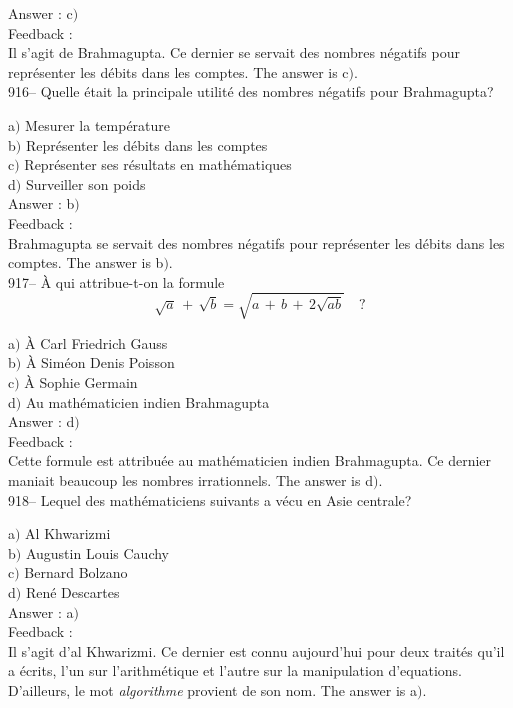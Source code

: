 ﻿\documentclass[letterpaper, 12pt]{article}
\begin{document}
Answer : c$)$\\

Feedback : \\
Il s'agit de Brahmagupta. Ce dernier se servait des nombres n\'egatifs pour
repr\'esenter les d\'ebits dans les comptes. The answer is c$)$.\\

916-- Quelle \'etait la principale utilit\'e des nombres n\'egatifs
pour Brahmagupta?

a$)$ Mesurer la temp\'erature \\
b$)$ Repr\'esenter les d\'ebits dans les comptes \\
c$)$ Repr\'esenter ses r\'esultats en math\'ematiques \\
d$)$ Surveiller son poids  \\

Answer : b$)$\\

Feedback : \\
Brahmagupta se servait des nombres n\'egatifs pour repr\'esenter les
d\'ebits dans les comptes. The answer is b$)$.\\

917-- \`A qui attribue-t-on la formule
$$\sqrt a\,+\,\sqrt b=\sqrt{a\,+\,b\,+\,2\sqrt{ab}}\quad?$$

a$)$ \`A Carl Friedrich Gauss \\
b$)$ \`A Sim\'eon Denis Poisson \\
c$)$ \`A Sophie Germain \\
d$)$ Au math\'ematicien indien Brahmagupta  \\

Answer : d$)$\\

Feedback : \\
Cette formule est attribu\'ee au math\'ematicien indien Brahmagupta.
Ce dernier maniait
beaucoup les nombres irrationnels. The answer is d$)$.\\

918-- Lequel des math\'ematiciens suivants a v\'ecu en Asie
centrale?

a$)$ Al Khwarizmi \\
b$)$ Augustin Louis Cauchy \\
c$)$ Bernard Bolzano \\
d$)$ Ren\'e Descartes  \\

Answer : a$)$\\

Feedback : \\
Il s'agit d'al Khwarizmi. Ce dernier est connu aujourd'hui pour deux
trait\'es qu'il a \'ecrits, l'un sur l'arithm\'etique et l'autre sur
la manipulation d'equations. D'ailleurs, le mot
{\sl algorithme} provient de son nom. The answer is a$)$.\\
\end{document}
